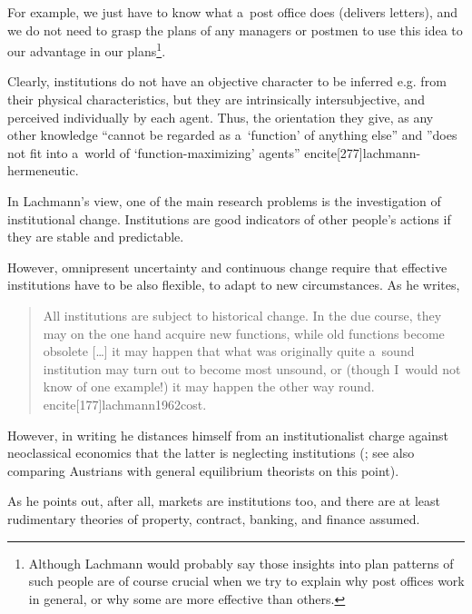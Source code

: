 {\begin{quote}
\end{quote}

For example, we just have to know what a~post office does (delivers letters), and we do not need to grasp the plans of any managers or postmen to use this idea to our advantage in our plans\footnote{Although Lachmann would probably say those insights into plan patterns of such people are of course crucial when we try to explain why post offices work in general, or why some are more effective than others.}.



Clearly, institutions do not have an objective character to be inferred e.g. from their physical characteristics, but they are intrinsically intersubjective, and perceived individually by each agent. Thus, the orientation they give, as any other knowledge ``cannot be regarded as a~`function' of anything else'' and ''does not fit into a~world of `function-maximizing' agents'' encite[277]{lachmann-hermeneutic}.



In Lachmann's view, one of the main research problems is the investigation of institutional change. Institutions are good indicators of other people's actions if they are stable and predictable.

However, omnipresent uncertainty and continuous change require that effective institutions have to be also flexible, to adapt to new circumstances. As he writes,

\begin{quote}

All institutions are subject to historical change. In the due course, they may on the one hand acquire new functions, while old functions become obsolete [\ldots] it may happen that what was originally quite a~sound institution may turn out to become most unsound, or (though I~would not know of one example!) it may happen the other way round. encite[177]{lachmann1962cost}.

\end{quote}



However, in writing he distances himself from an institutionalist charge against neoclassical economics that the latter is neglecting institutions (\cite[275]{lachmann-hermeneutic}; see also \cite[499]{udehn} comparing Austrians with general equilibrium theorists on this point).

As he points out, after all, markets are institutions too, and there are at least rudimentary theories of property, contract, banking, and finance assumed.

}
